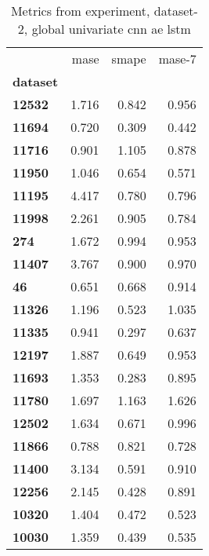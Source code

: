 \begin{table}[h]
\centering
\caption{Metrics from experiment, dataset-2, global univariate cnn ae lstm}
\label{table:global-univariate-cnn-ae-lstm-dataset-2}
\begin{tabular}{lrrr}
\toprule
{} &   mase &  smape &  mase-7 \\
\textbf{dataset} &        &        &         \\
\midrule
\textbf{12532  } &  1.716 &  0.842 &   0.956 \\
\textbf{11694  } &  0.720 &  0.309 &   0.442 \\
\textbf{11716  } &  0.901 &  1.105 &   0.878 \\
\textbf{11950  } &  1.046 &  0.654 &   0.571 \\
\textbf{11195  } &  4.417 &  0.780 &   0.796 \\
\textbf{11998  } &  2.261 &  0.905 &   0.784 \\
\textbf{274    } &  1.672 &  0.994 &   0.953 \\
\textbf{11407  } &  3.767 &  0.900 &   0.970 \\
\textbf{46     } &  0.651 &  0.668 &   0.914 \\
\textbf{11326  } &  1.196 &  0.523 &   1.035 \\
\textbf{11335  } &  0.941 &  0.297 &   0.637 \\
\textbf{12197  } &  1.887 &  0.649 &   0.953 \\
\textbf{11693  } &  1.353 &  0.283 &   0.895 \\
\textbf{11780  } &  1.697 &  1.163 &   1.626 \\
\textbf{12502  } &  1.634 &  0.671 &   0.996 \\
\textbf{11866  } &  0.788 &  0.821 &   0.728 \\
\textbf{11400  } &  3.134 &  0.591 &   0.910 \\
\textbf{12256  } &  2.145 &  0.428 &   0.891 \\
\textbf{10320  } &  1.404 &  0.472 &   0.523 \\
\textbf{10030  } &  1.359 &  0.439 &   0.535 \\
\bottomrule
\end{tabular}
\end{table}
